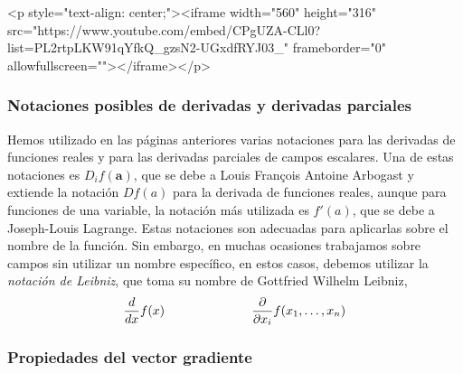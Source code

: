 \begin{rawhtml}
<p style="text-align: center;"><iframe width="560" height="316" src="https://www.youtube.com/embed/CPgUZA-CLl0?list=PL2rtpLKW91qYfkQ_gzsN2-UGxdfRYJ03_" frameborder="0" allowfullscreen=""></iframe></p>
\end{rawhtml}


\subsubsection{Notaciones posibles de derivadas y derivadas parciales}

Hemos utilizado en las páginas anteriores varias notaciones para las derivadas de funciones reales y para las derivadas parciales de campos escalares.
Una de estas notaciones es $D_if(\boldsymbol a)$, que se debe a Louis François Antoine Arbogast y extiende la notación $Df(a)$ para la derivada de funciones reales,
aunque para funciones de una variable, la notación más utilizada es $f'(a)$, que se debe a Joseph-Louis Lagrange.
Estas notaciones son adecuadas para aplicarlas sobre el nombre de la función.
Sin embargo, en muchas ocasiones trabajamos sobre campos sin utilizar un nombre específico, en estos casos, debemos utilizar la \emph{notación de Leibniz}, que toma su nombre de Gottfried Wilhelm Leibniz,
\[
\dfrac{d}{dx}f(x)\hspace{.2\textwidth} \dfrac{\partial}{\partial x_i}f(x_1,\dots,x_n)
\]

\subsubsection{Propiedades del vector gradiente}


